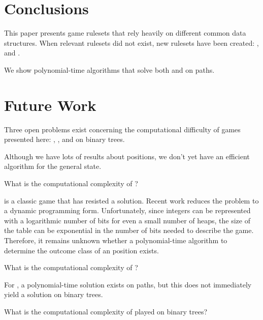 \documentclass[letter,10pt]{article}
\begin{document}
\section{Conclusions}

This paper presents game rulesets that rely heavily on different common data structures.  When relevant rulesets did not exist, new rulesets have been created: , and .  

We show polynomial-time algorithms that solve both  and  on paths.

\section{Future Work}

Three open problems exist concerning the computational difficulty of games presented here: , , and  on binary trees.

Although we have lots of results about  positions, we don't yet have an efficient algorithm for the general state.

\begin{openProblem}
    What is the computational complexity of ?
\end{openProblem}

 is a classic game that has resisted a solution.  Recent work reduces the problem to a dynamic programming form\cite{arXiv:1506.01042v1}.  Unfortunately, since integers can be represented with a logarithmic number of bits for even a small number of heaps, the size of the table can be exponential in the number of bits needed to describe the game. Therefore, it remains unknown whether a polynomial-time algorithm to determine the outcome class of an  position exists.

\begin{openProblem}[Antonim]
    What is the computational complexity of ?
\end{openProblem}

For , a polynomial-time solution exists on paths, but this does not immediately yield a solution on binary trees.

\begin{openProblem}
    What is the computational complexity of  played on binary trees?
\end{openProblem}
\end{document}

